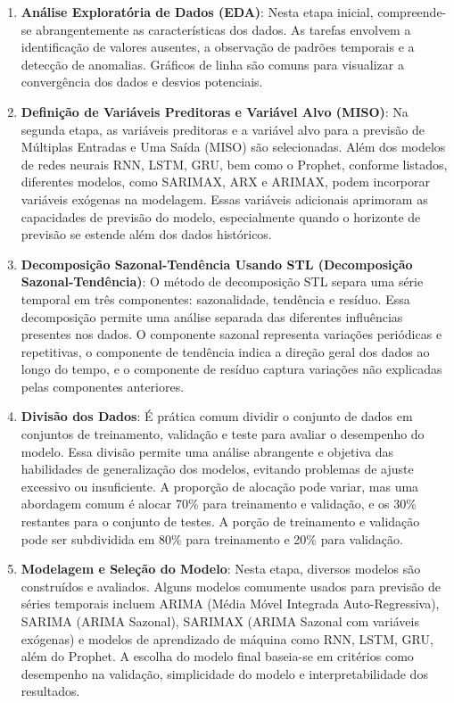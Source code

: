 \begin{enumerate}[start=1, label={\textbf{Etapa} \arabic*}]
	
	\item \label{etp:1} \textbf{Análise Exploratória de Dados (EDA)}: Nesta etapa inicial, compreende-se abrangentemente as características dos dados. As tarefas envolvem a identificação de valores ausentes, a observação de padrões temporais e a detecção de anomalias. Gráficos de linha são comuns para visualizar a convergência dos dados e desvios potenciais.
	
	\item \label{etp:2} \textbf{Definição de Variáveis Preditoras e Variável Alvo (MISO)}: Na segunda etapa, as variáveis preditoras e a variável alvo para a previsão de Múltiplas Entradas e Uma Saída (MISO) são selecionadas. Além dos modelos de redes neurais RNN, LSTM, GRU, bem como o Prophet, conforme listados, diferentes modelos, como SARIMAX, ARX e ARIMAX, podem incorporar variáveis exógenas na modelagem. Essas variáveis adicionais aprimoram as capacidades de previsão do modelo, especialmente quando o horizonte de previsão se estende além dos dados históricos.
	
	\item \label{etp:3} \textbf{Decomposição Sazonal-Tendência Usando STL (Decomposição Sazonal-Tendência)}: O método de decomposição STL separa uma série temporal em três componentes: sazonalidade, tendência e resíduo. Essa decomposição permite uma análise separada das diferentes influências presentes nos dados. O componente sazonal representa variações periódicas e repetitivas, o componente de tendência indica a direção geral dos dados ao longo do tempo, e o componente de resíduo captura variações não explicadas pelas componentes anteriores.
	
	\item \label{etp:4} \textbf{Divisão dos Dados}: É prática comum dividir o conjunto de dados em conjuntos de treinamento, validação e teste para avaliar o desempenho do modelo. Essa divisão permite uma análise abrangente e objetiva das habilidades de generalização dos modelos, evitando problemas de ajuste excessivo ou insuficiente. A proporção de alocação pode variar, mas uma abordagem comum é alocar 70\% para treinamento e validação, e os 30\% restantes para o conjunto de testes. A porção de treinamento e validação pode ser subdividida em 80\% para treinamento e 20\% para validação.
	
	\item \label{etp:5} \textbf{Modelagem e Seleção do Modelo}: Nesta etapa, diversos modelos são construídos e avaliados. Alguns modelos comumente usados para previsão de séries temporais incluem ARIMA (Média Móvel Integrada Auto-Regressiva), SARIMA (ARIMA Sazonal), SARIMAX (ARIMA Sazonal com variáveis exógenas) e modelos de aprendizado de máquina como RNN, LSTM, GRU, além do Prophet. A escolha do modelo final baseia-se em critérios como desempenho na validação, simplicidade do modelo e interpretabilidade dos resultados.
	

\end{enumerate}
